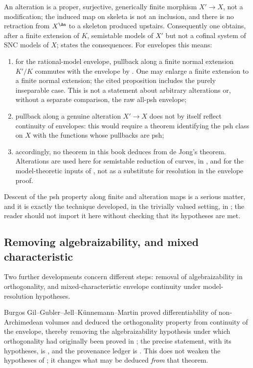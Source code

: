 An alteration is a proper, surjective, generically finite morphism
$X'\to X$, not a modification; the induced map on skeleta is not an
inclusion, and there is no retraction from $X^{\An}$ to a skeleton
produced upstairs.  Consequently one obtains, after a finite extension of
$K$, semistable models of $X'$ but not a cofinal system of SNC models of
$X$;  states the consequences.  For envelopes
this means:
\begin{enumerate}
\item for the rational-model envelope, pullback along a finite normal
extension $K'/K$ commutes with the envelope by
\cite[Proposition~2.11]{GJKM19}.  One may enlarge a finite extension to
a finite normal extension; the cited proposition includes the purely
inseparable case.  This is not a statement about arbitrary alterations or,
without a separate comparison, the raw all-psh envelope;
\item pullback along a genuine alteration $X'\to X$ does not by itself
reflect continuity of envelopes: this would require a theorem identifying
the psh class on $X$ with the functions whose pullbacks are psh;
\item accordingly, no theorem in this book deduces
 from de Jong's theorem.  Alterations are
used here for semistable reduction of curves, in
, and for the model-theoretic
inputs of , not as a substitute for resolution in the
envelope proof.
\end{enumerate}
Descent of the psh property along finite and alteration maps is a serious
matter, and it is exactly the technique developed, in the trivially valued
setting, in ; the reader should not import it here
without checking that its hypotheses are met.

\subsection{Removing algebraizability, and mixed characteristic}
\label{sec:ch23-later-algebraizability}

Two further developments concern different steps: removal of
algebraizability in orthogonality, and mixed-characteristic envelope
continuity under model-resolution hypotheses.

Burgos Gil--Gubler--Jell--K\"unnemann--Martin proved differentiability of
non-Archimedean volumes and deduced the orthogonality property from
continuity of the envelope, thereby removing the algebraizability
hypothesis under which orthogonality had originally been proved in
\cite{BFJ15}; the precise statement, with its hypotheses, is
, and the provenance ledger is
.  This does not weaken the hypotheses of
; it changes what may be deduced
\emph{from} that theorem.

